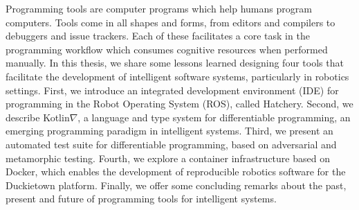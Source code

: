 \documentclass[12pt,initial,twoside,maitrise]{dms}
\numberwithin{equation}{section}
\numberwithin{table}{chapter}
\numberwithin{figure}{chapter}
\begin{document}
Programming tools are computer programs which help humans program computers. Tools come in all shapes and forms, from editors and compilers to debuggers and issue trackers. Each of these facilitates a core task in the programming workflow which consumes cognitive resources when performed manually. In this thesis, we share some lessons learned designing four tools that facilitate the development of intelligent software systems, particularly in robotics settings. First, we introduce an integrated development environment (IDE) for programming in the Robot Operating System (ROS), called Hatchery. Second, we describe Kotlin$\nabla$, a language and type system for differentiable programming, an emerging programming paradigm in intelligent systems. Third, we present an automated test suite for differentiable programming, based on adversarial and metamorphic testing. Fourth, we explore a container infrastructure based on Docker, which enables the development of reproducible robotics software for the Duckietown platform. Finally, we offer some concluding remarks about the past, present and future of programming tools for intelligent systems.
\end{document}
